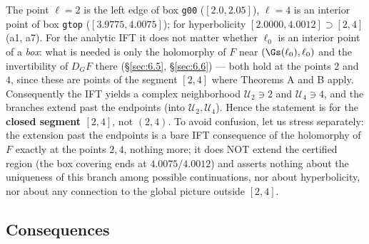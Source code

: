 The point $\ell=2$ is the left edge of box \texttt{g00} ($[2.0,2.05]$), $\ell=4$ is
an interior point of box \texttt{gtop} ($[3.9775,4.0075]$); for hyperbolicity
$[2.0000,4.0012]\supset[2,4]$ (a1, a7). For the analytic IFT it does not
matter whether $\ell_0$ is an interior point of a \emph{box}: what is needed is
only the holomorphy of $F$ near $(\Gs(\ell_0),\ell_0)$ and the
invertibility of $D_GF$ there (\S\ref{sec:6.5}, \S\ref{sec:6.6}) --- both hold at the points $2$ and
$4$, since these are points of the segment $[2,4]$ where Theorems A and B
apply. Consequently the IFT yields a complex neighborhood $\mathcal U_2\ni2$
and $\mathcal U_4\ni4$, and the branches extend past the endpoints (into
$\mathcal U_2,\mathcal U_4$). Hence the statement is for the \textbf{closed
segment \boldmath$[2,4]$}, not $(2,4)$. To avoid confusion, let us stress
separately: the extension past the endpoints is a bare IFT consequence of
the holomorphy of $F$ exactly at the points $2,4$, nothing more; it does NOT
extend the certified region (the box covering ends at $4.0075$/$4.0012$) and
asserts nothing about the uniqueness of this branch among possible
continuations, nor about hyperbolicity, nor about any connection to the
global picture outside $[2,4]$.


\subsection{Consequences}
\label{sec:6.10}

